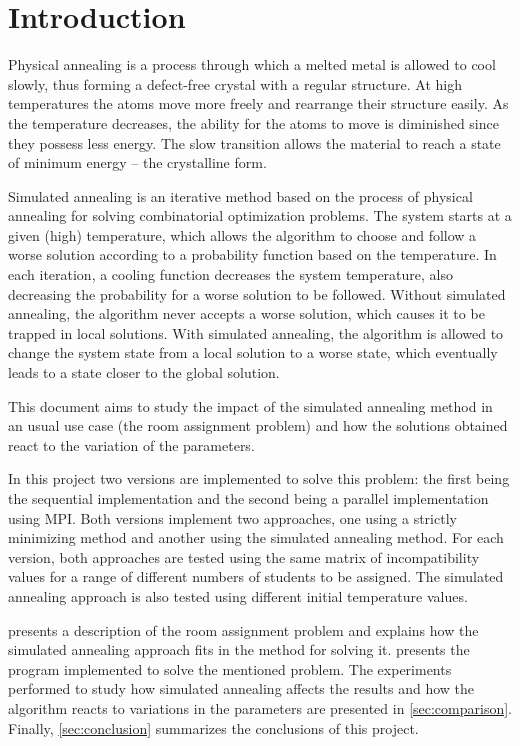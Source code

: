 \section{Introduction}
Physical annealing is a process through which a melted metal is allowed to cool slowly, thus forming a defect-free crystal with a regular structure. At high temperatures the atoms move more freely and rearrange their structure easily. As the temperature decreases, the ability for the atoms to move is diminished since they possess less energy. The slow transition allows the material to reach a state of minimum energy -- the crystalline form.

Simulated annealing is an iterative method based on the process of physical annealing for solving combinatorial optimization problems. The system starts at a given (high) temperature, which allows the algorithm to choose and follow a worse solution according to a probability function based on the temperature. In each iteration, a cooling function decreases the system temperature, also decreasing the probability for a worse solution to be followed. Without simulated annealing, the algorithm never accepts a worse solution, which causes it to be trapped in local solutions. With simulated annealing, the algorithm is allowed to change the system state from a local solution to a worse state, which eventually leads to a state closer to the global solution.

This document aims to study the impact of the simulated annealing method in an usual use case (the room assignment problem) and how the solutions obtained react to the variation of the parameters.

In this project two versions are implemented to solve this problem: the first being the sequential implementation and the second being a parallel implementation using MPI. Both versions implement two approaches, one using a strictly minimizing method and another using the simulated annealing method. For each version, both approaches are tested using the same matrix of incompatibility values for a range of different numbers of students to be assigned. The simulated annealing approach is also tested using different initial temperature values.

 presents a description of the room assignment problem and explains how the simulated annealing approach fits in the method for solving it.  presents the program implemented to solve the mentioned problem. The experiments performed to study how simulated annealing affects the results and how the algorithm reacts to variations in the parameters are presented in \cref{sec:comparison}. Finally, \cref{sec:conclusion} summarizes the conclusions of this project.